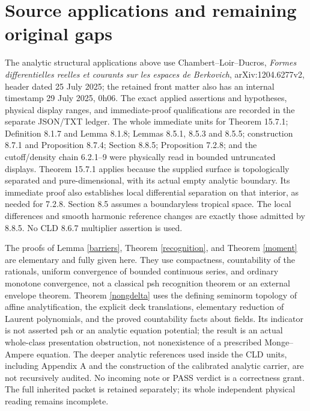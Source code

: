 \documentclass[11pt]{article}
\begin{document}
\section*{Source applications and remaining original gaps}
The analytic structural applications above use Chambert--Loir--Ducros,
\emph{Formes differentielles reelles et courants sur les espaces de
Berkovich}, arXiv:1204.6277v2, header dated 25 July 2025; the retained
front matter also has an internal timestamp 29 July 2025, 0h06.
The exact applied assertions and
hypotheses, physical display ranges, and immediate-proof qualifications
are recorded in the separate JSON/TXT ledger. The whole immediate
units for Theorem 15.7.1; Definition 8.1.7 and Lemma 8.1.8; Lemmas
8.5.1, 8.5.3 and 8.5.5; construction 8.7.1 and Proposition 8.7.4;
Section 8.8.5; Proposition 7.2.8; and the cutoff/density chain 6.2.1--9
were physically read in bounded untruncated displays. Theorem 15.7.1
applies because the supplied surface is topologically separated and
pure-dimensional, with its actual empty analytic boundary. Its immediate
proof also establishes local differential separation on that interior,
as needed for 7.2.8. Section 8.5 assumes a boundaryless tropical space.
The local differences and smooth harmonic reference changes are exactly
those admitted by 8.8.5. No CLD 8.6.7 multiplier assertion is used.

The proofs of Lemma \ref{barriers}, Theorem \ref{recognition}, and
Theorem \ref{moment} are elementary and fully given here. They use
compactness, countability of the rationals, uniform convergence of
bounded continuous series, and ordinary monotone convergence, not a
classical psh recognition theorem or an external envelope theorem.
Theorem \ref{nongdelta} uses the defining seminorm topology of affine
analytification, the explicit deck translations, elementary reduction
of Laurent polynomials, and the proved countability facts about fields.
Its indicator is not asserted psh or an analytic equation potential;
the result is an actual whole-class presentation obstruction, not
nonexistence of a prescribed Monge--Ampere equation.
The deeper analytic references used inside the CLD units, including
Appendix A and the construction of the calibrated analytic carrier,
are not recursively audited. No incoming note or PASS verdict is a
correctness grant. The full inherited packet is retained separately;
its whole independent physical reading remains incomplete.
\end{document}
